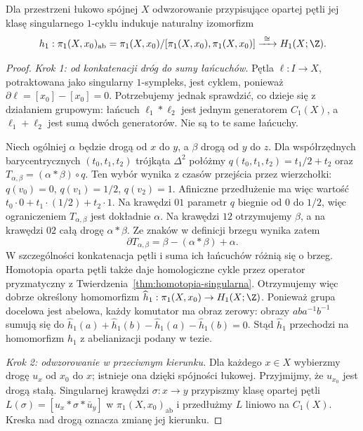 \begin{twierdzenie}
\label{thm:hurewicz-h1}
Dla przestrzeni łukowo spójnej $X$ odwzorowanie przypisujące
opartej pętli jej klasę singularnego $1$-cyklu indukuje naturalny
izomorfizm
\[
 h_1:\pi_1(X,x_0)_{\mathrm{ab}}
 =\pi_1(X,x_0)/[\pi_1(X,x_0),\pi_1(X,x_0)]
 \xrightarrow{\ \cong\ }H_1(X;\Z).
\]
\end{twierdzenie}
\begin{proof}
\emph{Krok 1: od konkatenacji dróg do sumy łańcuchów.}
Pętla $\ell:I\to X$, potraktowana jako singularny $1$-sympleks,
jest cyklem, ponieważ $\partial\ell=[x_0]-[x_0]=0$.
Potrzebujemy jednak sprawdzić, co dzieje się z działaniem grupowym:
łańcuch $\ell_1*\ell_2$ jest jednym generatorem $C_1(X)$,
a $\ell_1+\ell_2$ jest sumą dwóch generatorów. Nie są to te same łańcuchy.

Niech ogólniej $\alpha$ będzie drogą od $x$ do $y$, a $\beta$
drogą od $y$ do $z$. Dla współrzędnych barycentrycznych
$(t_0,t_1,t_2)$ trójkąta $\Delta^2$ połóżmy
$q(t_0,t_1,t_2)=t_1/2+t_2$ oraz
$T_{\alpha,\beta}=(\alpha*\beta)\circ q$.
Ten wybór wynika z czasów przejścia przez wierzchołki:
$q(v_0)=0$, $q(v_1)=1/2$, $q(v_2)=1$.
Afiniczne przedłużenie ma więc wartość
$t_0\cdot0+t_1\cdot(1/2)+t_2\cdot1$.
Na krawędzi $01$ parametr $q$ biegnie od $0$ do $1/2$,
więc ograniczeniem $T_{\alpha,\beta}$ jest dokładnie $\alpha$.
Na krawędzi $12$ otrzymujemy $\beta$, a na krawędzi $02$
całą drogę $\alpha*\beta$. Ze znaków w definicji brzegu wynika zatem
\[
 \partial T_{\alpha,\beta}
 =\beta-(\alpha*\beta)+\alpha.
\]
W szczególności konkatenacja pętli i suma ich łańcuchów
różnią się o brzeg. Homotopia oparta pętli także daje homologiczne
cykle przez operator pryzmatyczny z
Twierdzenia~\ref{thm:homotopia-singularna}.
Otrzymujemy więc dobrze określony homomorfizm
$\widehat h_1:\pi_1(X,x_0)\to H_1(X;\Z)$.
Ponieważ grupa docelowa jest abelowa, każdy komutator ma obraz zerowy:
obrazy $aba^{-1}b^{-1}$ sumują się do
$\widehat h_1(a)+\widehat h_1(b)-\widehat h_1(a)-\widehat h_1(b)=0$.
Stąd $\widehat h_1$ przechodzi na homomorfizm $h_1$
z abelianizacji podany w tezie.

\emph{Krok 2: odwzorowanie w przeciwnym kierunku.}
Dla każdego $x\in X$ wybierzmy drogę $u_x$ od $x_0$ do $x$;
istnieje ona dzięki spójności łukowej. Przyjmijmy, że $u_{x_0}$
jest drogą stałą. Singularnej krawędzi $\sigma:x\to y$ przypiszmy
klasę opartej pętli
$L(\sigma)=[u_x*\sigma*\bar u_y]$
w $\pi_1(X,x_0)_{\mathrm{ab}}$ i przedłużmy $L$ liniowo
na $C_1(X)$. Kreska nad drogą oznacza zmianę jej kierunku.


\end{proof}
